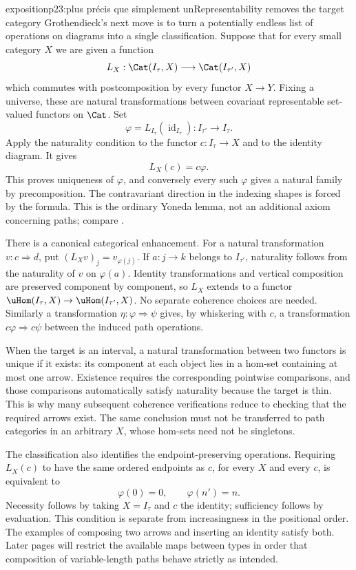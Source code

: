 \begin{dcomment}{exposition}{p23:plus précis que simplement un}{Representability removes the target category}
Grothendieck's next move is to turn a potentially endless list of operations on diagrams into a single classification. Suppose that for every small category $X$ we are given a function
\[
L_X:\Cat(I_\tau,X)\longrightarrow\Cat(I_{\tau'},X)
\]
which commutes with postcomposition by every functor $X\to Y$. Fixing a universe, these are natural transformations between covariant representable set-valued functors on $\Cat$. Set
\[
\varphi=L_{I_\tau}(\operatorname{id}_{I_\tau}):I_{\tau'}\longrightarrow I_\tau.
\]
Apply the naturality condition to the functor $c:I_\tau\to X$ and to the identity diagram. It gives
\[
L_X(c)=c\varphi.
\]
This proves uniqueness of $\varphi$, and conversely every such $\varphi$ gives a natural family by precomposition. The contravariant direction in the indexing shapes is forced by the formula. This is the ordinary Yoneda lemma, not an additional axiom concerning paths; compare \citet[Theorem~2.2.4 and Corollary~2.2.8]{Riehl2016}.

There is a canonical categorical enhancement. For a natural transformation $v:c\Rightarrow d$, put $(L_Xv)_j=v_{\varphi(j)}$. If $a:j\to k$ belongs to $I_{\tau'}$, naturality follows from the naturality of $v$ on $\varphi(a)$. Identity transformations and vertical composition are preserved component by component, so $L_X$ extends to a functor $\uHom(I_\tau,X)\to\uHom(I_{\tau'},X)$. No separate coherence choices are needed. Similarly a transformation $\eta:\varphi\Rightarrow\psi$ gives, by whiskering with $c$, a transformation $c\varphi\Rightarrow c\psi$ between the induced path operations.

When the target is an interval, a natural transformation between two functors is unique if it exists: its component at each object lies in a hom-set containing at most one arrow. Existence requires the corresponding pointwise comparisons, and those comparisons automatically satisfy naturality because the target is thin. This is why many subsequent coherence verifications reduce to checking that the required arrows exist. The same conclusion must not be transferred to path categories in an arbitrary $X$, whose hom-sets need not be singletons.

The classification also identifies the endpoint-preserving operations. Requiring $L_X(c)$ to have the same ordered endpoints as $c$, for every $X$ and every $c$, is equivalent to
\[
\varphi(0)=0,\qquad \varphi(n')=n.
\]
Necessity follows by taking $X=I_\tau$ and $c$ the identity; sufficiency follows by evaluation. This condition is separate from increasingness in the positional order. The examples of composing two arrows and inserting an identity satisfy both. Later pages will restrict the available maps between types in order that composition of variable-length paths behave strictly as intended.
\end{dcomment}

